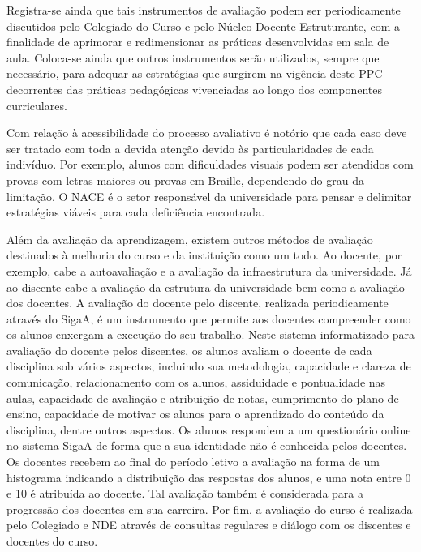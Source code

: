 Registra-se ainda que tais instrumentos de avaliação podem ser periodicamente discutidos pelo Colegiado do Curso e pelo Núcleo Docente Estruturante, com a finalidade de aprimorar e redimensionar as práticas desenvolvidas em sala de aula. Coloca-se ainda que outros instrumentos serão utilizados, sempre que necessário, para adequar as estratégias que surgirem na vigência deste PPC decorrentes das práticas pedagógicas vivenciadas ao longo dos componentes curriculares.

Com relação à acessibilidade do processo avaliativo é notório que cada caso deve ser tratado com toda a devida atenção devido às particularidades de cada indivíduo. Por exemplo, alunos com dificuldades visuais podem ser atendidos com provas com letras maiores ou provas em Braille, dependendo do grau da limitação. O NACE é o setor responsável da universidade para pensar e delimitar estratégias viáveis para cada deficiência encontrada. 

Além da avaliação da aprendizagem, existem outros métodos de avaliação destinados à melhoria do curso e da instituição como um todo. Ao docente, por exemplo, cabe a autoavaliação e a avaliação da infraestrutura da universidade. Já ao discente cabe a avaliação da estrutura da universidade bem como a avaliação dos docentes. A avaliação do docente pelo discente, realizada periodicamente através do SigaA, é um instrumento que permite aos docentes compreender como os alunos enxergam a execução do seu trabalho. Neste sistema informatizado para avaliação do docente pelos discentes, os alunos avaliam o docente de cada disciplina sob vários aspectos, incluindo sua metodologia, capacidade e clareza de comunicação, relacionamento com os alunos, assiduidade e pontualidade nas aulas, capacidade de avaliação e atribuição de notas, cumprimento do plano de ensino, capacidade de motivar os alunos para o aprendizado do conteúdo da disciplina, dentre outros aspectos. Os alunos respondem a um questionário online no sistema SigaA de forma que a sua identidade não é conhecida pelos docentes. Os docentes recebem ao final do período letivo a avaliação na forma de um histograma indicando a distribuição das respostas dos alunos, e uma nota entre 0 e 10 é atribuída ao docente. Tal avaliação também é considerada para a progressão dos docentes em sua carreira. Por fim, a avaliação do curso é realizada pelo Colegiado e NDE através de consultas regulares e diálogo com os discentes e docentes do curso.

